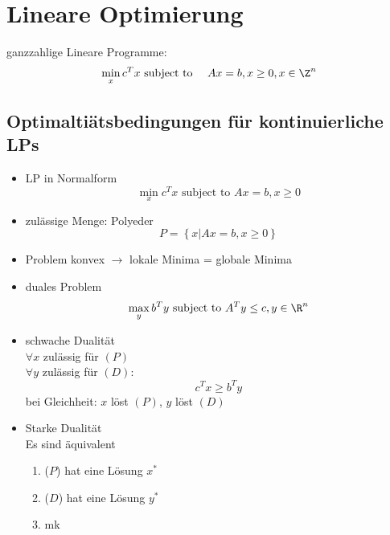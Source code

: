 \section{Lineare Optimierung}
ganzzahlige Lineare Programme:
\begin{equation*}
	\min_{x} c^Tx \text{ subject to } \quad Ax = b, x \geq 0, x \in \Z^n
\end{equation*} 
\subsection{Optimaltiätsbedingungen für kontinuierliche LPs}
\begin{itemize}
	\item LP in Normalform 
		\begin{equation*}
			\min_{x} c^Tx \text{ subject to } Ax = b, x\geq 0
		\end{equation*} 
	\item zulässige Menge: Polyeder
		\begin{equation*}
			P = \left\{ x | Ax = b ,x \geq 0 \right\}
		\end{equation*} 
	\item Problem konvex $\to$	lokale Minima = globale Minima	
	\item duales Problem
		\begin{equation}\label{D}
			\max_{y}b^Ty \text{ subject to } A^Ty \leq c, y \in \R^n
		\end{equation} 
	\item schwache Dualität\\
		$\forall x$ zulässig für $(P)$\\%
		$\forall y$ zulässig für $(D)$:%
		\begin{equation*}
			c^Tx \geq b^Ty
		\end{equation*} 
		bei Gleichheit: $x$ löst $(P)$, $y$ löst $(D)$
	\item Starke Dualität\\
		Es sind äquivalent 
		\begin{enumerate}
			\item ($P$) hat eine Lösung $x^*$
			\item ($D$) hat eine Lösung $y^*$ 
			\item mk
		\end{enumerate} 
		
		

\end{itemize}
